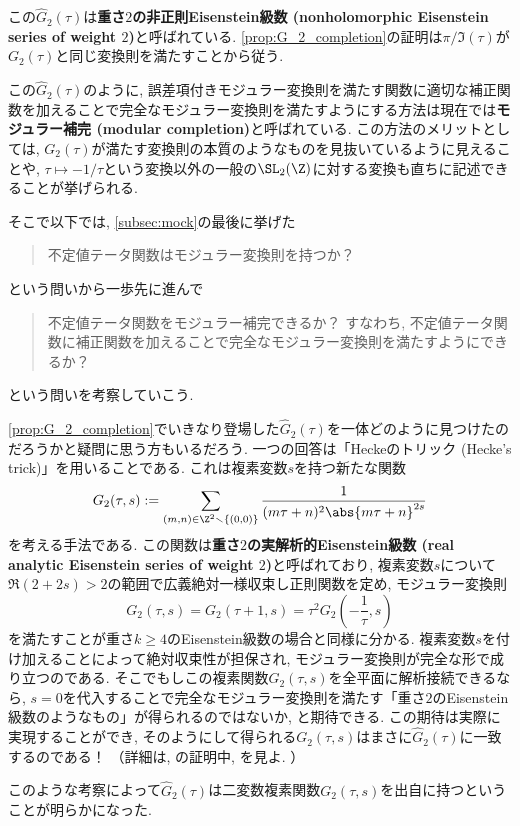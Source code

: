 \documentclass[11pt,b5paper,oneside,lualatex]{ltjsarticle} %
\numberwithin{equation}{section} %
\begin{document}
この$ \widehat{G}_2 (\tau) $は\textbf{重さ$ 2 $の非正則Eisenstein級数 (nonholomorphic Eisenstein series of weight $ 2 $)}と呼ばれている. 
\cref{prop:G_2_completion}の証明は$ \pi / \Im (\tau) $が$ G_2(\tau) $と同じ変換則を満たすことから従う. 

この$ \widehat{G}_2 (\tau) $のように, 誤差項付きモジュラー変換則を満たす関数に適切な補正関数を加えることで完全なモジュラー変換則を満たすようにする方法は現在では\textbf{モジュラー補完 (modular completion)}と呼ばれている. 
この方法のメリットとしては, $ G_2(\tau) $が満たす変換則の本質のようなものを見抜いているように見えることや, $ \tau \mapsto -1/\tau $という変換以外の一般の$ \SL_2(\Z) $に対する変換も直ちに記述できることが挙げられる. 

そこで以下では, \cref{subsec:mock}の最後に挙げた
\begin{quote}
	\centering
	不定値テータ関数はモジュラー変換則を持つか？
\end{quote}
という問いから一歩先に進んで
\begin{quote}
	\centering
	不定値テータ関数をモジュラー補完できるか？
	すなわち, 不定値テータ関数に補正関数を加えることで完全なモジュラー変換則を満たすようにできるか？
\end{quote}
という問いを考察していこう. 

\begin{rem}
	\cref{prop:G_2_completion}でいきなり登場した$ \widehat{G}_2 (\tau) $を一体どのように見つけたのだろうかと疑問に思う方もいるだろう. 
	一つの回答は「Heckeのトリック (Hecke's trick)」を用いることである. 
	これは複素変数$ s $を持つ新たな関数
	\[
	G_2 (\tau, s) := \sum_{(m, n) \in \Z^2 \smallsetminus \{ (0, 0) \}} \frac{1}{(m\tau + n)^2 \abs{m\tau + n}^{2s}}
	\]
	を考える手法である. 
	この関数は\textbf{重さ$ 2 $の実解析的Eisenstein級数 (real analytic Eisenstein series of weight $ 2 $)}と呼ばれており, 
	複素変数$ s $について$ \Re(2+2s) > 2 $の範囲で広義絶対一様収束し正則関数を定め, モジュラー変換則
	\[
	G_2 (\tau, s) = G_2 (\tau+1, s) = \tau^{2} G_2 \left( - \frac{1}{\tau}, s \right)
	\]
	を満たすことが重さ$ k \ge 4 $のEisenstein級数の場合と同様に分かる. 
	複素変数$ s $を付け加えることによって絶対収束性が担保され, モジュラー変換則が完全な形で成り立つのである. 
	そこでもしこの複素関数$ G_2 (\tau, s) $を全平面に解析接続できるなら, $ s=0 $を代入することで完全なモジュラー変換則を満たす「重さ$ 2 $のEisenstein級数のようなもの」が得られるのではないか, と期待できる. 
	この期待は実際に実現することができ, そのようにして得られる$ G_2 (\tau, s) $はまさに$ \widehat{G}_2 (\tau) $に一致するのである！
	（詳細は\cite[Theorem 4.10.2]{DS}, \cite[pp.~19, Proposition 6]{1-2-3}の証明中, \cite[Lemma 6.2]{BFOR}を見よ. ）
	
	このような考察によって$ \widehat{G}_2 (\tau) $は二変数複素関数$ G_2 (\tau, s) $を出自に持つということが明らかになった. 
\end{rem}
\end{document}
